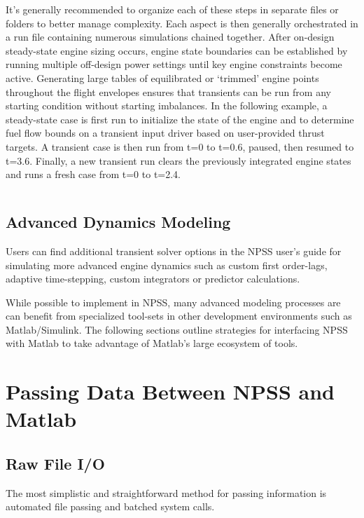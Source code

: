 \documentclass[heading.tex]{subfiles}
\begin{document}
It's generally recommended to organize each of these steps in separate files or folders to better manage complexity.
Each aspect is then generally orchestrated in a run file containing numerous simulations chained together. 
After on-design steady-state engine sizing occurs, engine state boundaries can be established by running multiple
off-design power settings until key engine constraints become active.
Generating large tables of equilibrated or `trimmed' engine points
throughout the flight envelopes ensures that transients can be run from any starting condition without
starting imbalances.
In the following example, a steady-state case is first run to initialize the state of the engine and
to determine fuel flow bounds on a transient input driver based on user-provided thrust targets.
A transient case is then run from t=0 to t=0.6, paused, then resumed to t=3.6.
Finally, a new transient run clears the previously integrated engine states and runs a fresh case from t=0 to t=2.4.

 \begin{adjustwidth}{1cm}{-1cm}
 \inputminted[]{c++}{code/transientRun}
 \end{adjustwidth} 

\subsection{Advanced Dynamics Modeling}

Users can find additional transient solver options in the NPSS user's guide \cite[chap.~18]{NPSS} for simulating
more advanced engine dynamics such as custom first order-lags, adaptive time-stepping, custom integrators or
predictor calculations.

While possible to implement in NPSS, many advanced modeling processes are can benefit
from specialized tool-sets in other development environments such as Matlab/Simulink.
The following sections outline strategies for interfacing NPSS with Matlab to take advantage of Matlab's large
ecosystem of tools.

\section{Passing Data Between NPSS and Matlab}
\subsection{Raw File I/O}

The most simplistic and straightforward method for passing information is automated
file passing and batched system calls.
\end{document}
